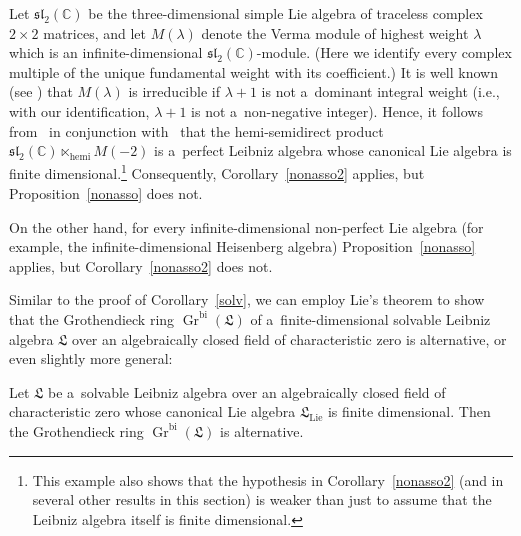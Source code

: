 \documentclass{jonasart}
\DeclareMathOperator{\bi}{bi}
\DeclareMathOperator{\hemi}{hemi}
\DeclareMathOperator{\K}{Gr}
\DeclareMathOperator{\lie}{Lie}
\newcommand{\cbb}{\mathbb{C}}
\newcommand{\lf}{\mathfrak{L}}
\newcommand{\slf}{\mathfrak{sl}}
\begin{document}
	\begin{example}\label{nonasso3}
		{Let $\slf_2 (\cbb)$ be the three-dimensional simple Lie algebra of traceless complex $2\times 2$ matrices, and let $M(\lambda)$ denote the Verma module of highest weight $\lambda$ which is an infinite-dimensional
		$\slf_2 (\cbb)$-module. (Here we identify every complex multiple of the unique fundamental weight with its coefficient.) It is well known (see
		\cite[Exercise 7\,(c) in
		Section 7]{H}) that $M(\lambda)$ is irreducible if $\lambda+1$
		is not a~dominant integral weight (i.e., with our identification, $\lambda+1$
		is not a~non-negative integer). Hence, it follows from~\cite[Theorem 2.3]{F2}
		in conjunction with~\cite[Proposition 7.1]{F1} that the hemi-semidirect product $\slf_2 (\cbb)\ltimes_{\hemi} M(-2)$ is a~perfect Leibniz algebra whose canonical Lie algebra is finite dimensional.\footnote{This example also shows that the hypothesis in Corollary~\ref{nonasso2} (and in several other results in this section) is weaker than just to assume that the Leibniz algebra itself is finite dimensional.} Consequently, Corollary~\ref{nonasso2}
		applies, but Proposition~\ref{nonasso} does not.}

		{On the other hand, for every infinite-dimensional non-perfect Lie algebra (for example, the infinite-dimensional Heisenberg algebra)
		Proposition~\ref{nonasso} applies, but Corollary~\ref{nonasso2} does not.}
	\end{example}
	Similar to the proof of Corollary~\ref{solv}, we can employ Lie's theorem to show that the Grothendieck ring $\K^{\bi}(\lf)$ of a~finite-dimensional solvable
	Leibniz algebra $\lf$ over an algebraically closed field of characteristic zero is alternative, or even slightly more general:
	\begin{theorem}\label{alt}
		Let $\lf$ be a~solvable Leibniz algebra over an algebraically closed field of characteristic zero whose canonical Lie algebra $\lf_{\lie}$ is finite dimensional. Then the Grothendieck ring $\K^{\bi}(\lf)$ is alternative.
	\end{theorem}
\end{document}
